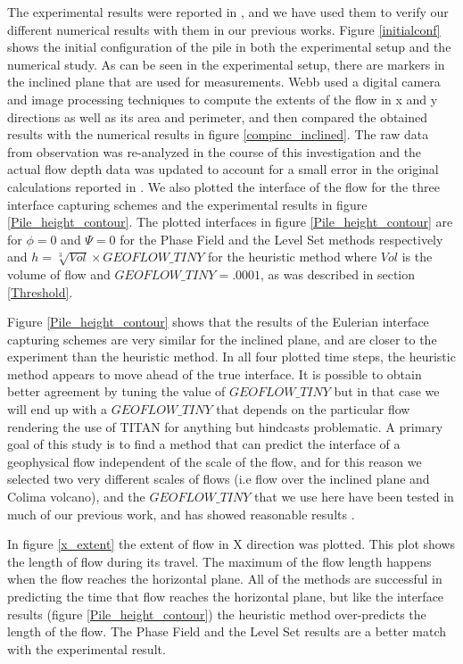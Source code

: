 \documentclass[review]{elsarticle}
\begin{document}
The experimental results were reported in \cite{AmyWebb2004}, and we have used them to verify our different numerical results with them in our previous works. 
Figure \ref{initialconf} shows the initial configuration of the pile in both the experimental setup and the numerical study. As can be seen in the experimental setup, 
there are markers in the inclined plane that are used for measurements. Webb \cite{AmyWebb2004}
  used a digital camera and image processing techniques to compute the extents of the flow in 
x and y directions as well as its area and perimeter, and then compared the obtained results with the numerical results in figure \ref{compinc_inclined}. The raw data
from observation was re-analyzed in the course of this investigation and the actual flow depth data was updated to account for a small error in the original calculations
reported in \cite{AmyWebb2004}.
We also plotted 
the interface of the flow for the three interface capturing schemes and the experimental results in figure \ref{Pile_height_contour}.
The plotted interfaces in figure \ref{Pile_height_contour} are for $\phi=0$ and $\varPsi=0$ for the Phase Field and the Level Set methods respectively 
and $h=\sqrt[3]{Vol} \times GEOFLOW\_TINY $ for the heuristic method where $Vol$ is the volume of flow and $GEOFLOW\_TINY= .0001$, as was described in section \ref{Threshold}.

Figure \ref{Pile_height_contour} shows that the results of the Eulerian interface capturing schemes are very similar for the inclined plane, 
and are closer to the experiment than the heuristic method. In all four plotted time steps, the heuristic method appears to move ahead of the true  interface. 
It is possible to obtain better agreement by tuning the value of  $GEOFLOW\_TINY $  but in that case we will end up with a  $GEOFLOW\_TINY $ that
 depends on the particular flow rendering the use of TITAN for anything but hindcasts problematic. 
A primary goal of  this study is to find a method that can predict the interface of a geophysical flow independent of the scale of the flow, 
and for this reason we selected two very different scales of flows (i.e flow over the inclined plane and Colima volcano), 
and the $GEOFLOW\_TINY $ that we use here have been tested in much of our previous work, and has showed reasonable results \cite{Patra2005,Patra2006}. 

In figure \ref{x_extent} the extent of flow in X direction was plotted. This plot shows the length of flow during its travel. 
The maximum of the flow length happens when the flow reaches the horizontal plane. All of the methods are successful in predicting the time 
that flow reaches the horizontal plane, but like the interface results (figure \ref{Pile_height_contour}) the heuristic method over-predicts the length of the flow.
The Phase Field and the Level Set results are a better match with the experimental result.
\end{document}
